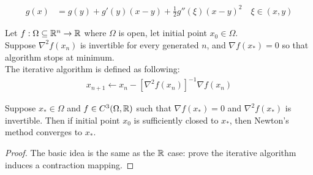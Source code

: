 \documentclass{article}
\begin{document}
	\begin{theorem}
		\begin{align}
			g(x) &= g(y) + g'(y) (x - y) + \frac{1}{2} g''(\xi) (x - y)^2\quad \xi \in (x, y)
		\end{align}
	\end{theorem}
	
	\begin{algorithm}
		Let $f: \Omega \subseteq \mathbb{R}^n \to \mathbb{R}$ where $\Omega$ is open, let initial point $x_0 \in \Omega$. \\
		Suppose $\nabla^2 f(x_n)$ is invertible for every generated $n$, and $\nabla f(x_*) = 0$ so that algorithm stops at minimum. \\
		The iterative algorithm is defined as following:
		\begin{align}
			x_{n+1} \leftarrow x_n - [\nabla^2 f(x_n)]^{-1} \nabla f(x_n)
		\end{align}
	\end{algorithm}
	
	\begin{theorem}[Generalization]
		Suppose $x_* \in \Omega$ and $f \in C^3(\Omega, \mathbb{R})$ such that $\nabla f(x_*) = 0$ and $\nabla^2 f(x_*)$ is invertible. Then if initial point $x_0$ is sufficiently closed to $x_*$, then Newton's method converges to $x_*$.
	\end{theorem}
	
	\begin{proof}
		The basic idea is the same as the $\mathbb{R}$ case: prove the iterative algorithm induces a contraction mapping.
	\end{proof}
	
\end{document}
